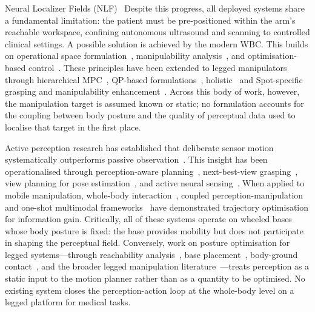  Neural Localizer Fields
(NLF)~\cite{isarandi2024nlf} 
Despite
this progress, all deployed systems share a fundamental limitation: the patient
must be pre-positioned within the arm's reachable workspace, confining
autonomous ultrasound and scanning to controlled clinical settings. A possible solution is achieved by the 
modern \ac{WBC}. This builds on operational space formulation~\cite{khatib1987},
manipulability analysis~\cite{yoshikawa1985}, and optimisation-based
control~\cite{wensing2023}. These principles have been extended to legged
manipulators through hierarchical \ac{MPC}~\cite{sleiman2021},
\ac{QP}-based formulations~\cite{li2022wbc}, holistic~\cite{haviland2022} and
Spot-specific grasping and manipulability enhancement~\cite{zimmermann2021,xie2024manip}.
Across this body of work, however, the manipulation target is assumed known or
static; no formulation accounts for the coupling between body posture and the
quality of perceptual data used to localise that target in the first place.


Active perception research has established that deliberate sensor motion
systematically outperforms passive observation~\cite{zeng2020,bai2021,zaky2020}.
This insight has been operationalised through perception-aware
planning~\cite{zhang2020fisher,tordesillas2022}, next-best-view
grasping~\cite{breyer2022}, view planning for pose estimation~\cite{hu2022}, and
active neural sensing~\cite{ren2023}. When applied to mobile manipulation,
whole-body interaction~\cite{mittal2022}, coupled
perception-manipulation~\cite{xie2024capm} and one-shot multimodal
frameworks~\cite{qin2026} have demonstrated trajectory optimisation for
information gain. Critically, all of these systems operate on wheeled bases
whose body posture is fixed: the base provides mobility but does not participate
in shaping the perceptual field. Conversely, work on posture optimisation for
legged systems---through reachability
analysis~\cite{makhal2018,zhao2025}, base placement~\cite{fan2021},
body-ground contact~\cite{wolfslag2020}, and the broader legged manipulation
literature~\cite{gong2023}---treats perception as a static input to the motion
planner rather than as a quantity to be optimised. No existing system closes the
perception-action loop at the whole-body level on a legged platform for medical
tasks.

